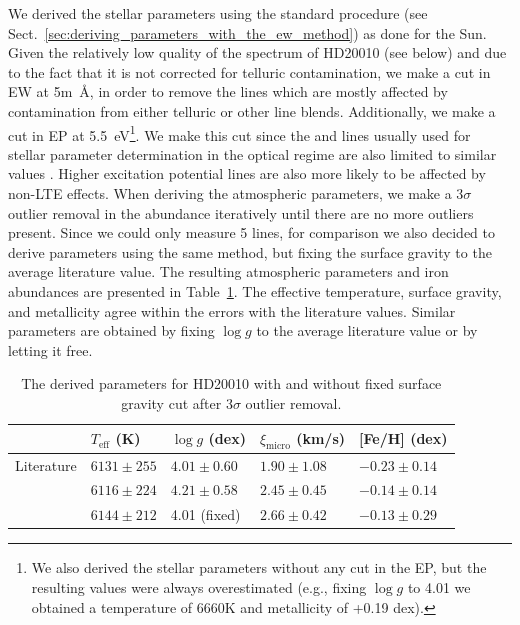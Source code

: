 \documentclass{aa}
\begin{document}
We derived the stellar parameters using the standard procedure (see
Sect.~\ref{sec:deriving_parameters_with_the_ew_method}) as done for
the Sun. Given the relatively low quality of the spectrum of HD20010
(see below) and due to the fact that it is not corrected for telluric
contamination, we make a cut in EW at 5\si{m\angstrom}, in order to
remove the lines which are mostly affected by contamination from
either telluric or other line blends. Additionally, we make a cut
in EP at \SI{5.5}{eV}\footnote{We also derived the stellar parameters
without any cut in the EP, but the resulting values were always
overestimated (e.g., fixing $\log g$ to 4.01 we obtained a temperature
of 6660K and metallicity of +0.19 dex).}. We make this cut since the  and
 lines usually used for stellar parameter determination
in the optical regime are also limited to similar values \citep[see
e.g.][]{Sousa2008a}. Higher excitation potential lines are also more
likely to be affected by non-LTE effects. When deriving the atmospheric parameters, we make a $3 \sigma$
outlier removal in the abundance iteratively until there are no more
outliers present. Since we could only measure 5  lines, for
comparison we also decided to derive parameters using the same method,
but fixing the surface gravity to the average literature value. The
resulting atmospheric parameters and iron abundances are presented in
Table~\ref{tab:hd20010}. The effective
temperature, surface gravity, and metallicity agree within the errors
with the literature values. Similar parameters are obtained by fixing
$\log g$ to the average literature value or by letting it free.

\begin{table}[htb!]
    \caption{The derived parameters for HD20010 with and without
    fixed surface gravity cut after 3$\sigma$ outlier removal.}
    \label{tab:hd20010}
    \centering
    \begin{tabular}{lllll}
      \hline\hline
                     & $T_\mathrm{eff}$ (K) &  $\log g$ (dex)  &   $\xi_\mathrm{micro}$ (km/s)  & [Fe/H] (dex)      \\
      \hline
        Literature   & $6131 \pm 255$       &  $4.01 \pm 0.60$ &    $1.90 \pm 1.08$              & $-0.23 \pm 0.14$ \\
      \hline
                     & $6116 \pm 224$       &  $4.21 \pm 0.58$ &    $2.45 \pm 0.45$              & $-0.14 \pm 0.14$ \\
                     & $6144 \pm 212$       &  4.01 (fixed)    &    $2.66 \pm 0.42$              & $-0.13 \pm 0.29$ \\
      \hline
    \end{tabular}
\end{table}
\end{document}

